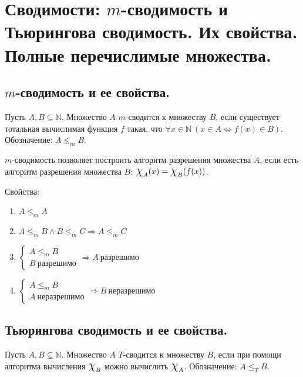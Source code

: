 \section{Сводимости: $m$-сводимость и Тьюрингова сводимость. Их свойства. Полные перечислимые множества.}

\subsection{$m$-сводимость и ее свойства.}

\begin{definition}
  Пусть $A,B \subseteq \mathbb{N}$. Множество $A$ $m$-сводится к множеству $B$, если существует тотальная вычислимая функция $f$ такая, что $\forall x \in \mathbb{N}\> (x \in A \Leftrightarrow f(x) \in B)$. Обозначение: $A \leqslant_m B$.
\end{definition}

$m$-сводимость позволяет построить алгоритм разрешения множества $A$, если есть алгоритм разрешения множества $B$: $\mbox{\Large$\chi$}_A(x) = \mbox{\Large$\chi$}_B(f(x))$.

\begin{statement}
  Свойства: \newline
  \begin{enumerate}
    \item $A \leqslant_m A$
    \item $A \leqslant_m B \wedge B \leqslant_m C \Rightarrow A \leqslant_m C$
    \item $\begin{cases}
      A \leqslant_m B \\
      B \> \textit{разрешимо}
    \end{cases} \Rightarrow A \> \textit{разрешимо}$ 
    \item $\begin{cases}
      A \leqslant_m B \\
      A \> \textit{неразрешимо}
    \end{cases} \Rightarrow B \> \textit{неразрешимо}$ 
  \end{enumerate}
\end{statement}

\subsection{Тьюрингова сводимость и ее свойства.}

\begin{definition}
  Пусть $A, B \subseteq \mathbb{N}$. Множество $A$ $T$-сводится к множеству $B$, если при помощи алгоритма вычисления $\mbox{\Large$\chi$}_B$ можно вычислить $\mbox{\Large$\chi$}_A$. Обозначение: $A \leqslant_T B$.
\end{definition}

